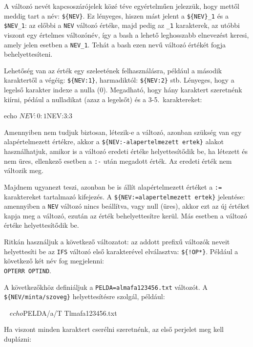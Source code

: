 A változó nevét kapcsoszárójelek közé téve egyértelműen jelezzük, hogy mettől
meddig tart a név: \texttt{\$\{NEV\}}. Ez lényeges, hiszen mást jelent a
\texttt{\$\{NEV\}\_1} és a \texttt{\$NEV\_1}: az előbbi a \texttt{NEV} változó
értéke, majd pedig az \texttt{\_1} karakterek, az utóbbi viszont egy értelmes
változónév, így a bash a lehető leghosszabb elnevezést keresi, amely jelen
esetben a \texttt{NEV\_1}. Tehát a bash ezen nevű változó értékét fogja
behelyettesíteni.

Lehetőség van az érték egy szeleetének felhasználásra, például 
a második karaktertől a végéig: \texttt{\$\{NEV:1\}},
harmadiktól: \texttt{\$\{NEV:2\}} stb. Lényeges, hogy a legelső karakter indexe
a nulla (0). Megadható, hogy hány karaktert szeretnénk kiírni, pédául a
nulladikat (azaz a legelsőt) és a 3-5.\ karaktereket:

\begin{VerbExample}
echo ${NEV:0:1} ${NEV:3:3}
\end{VerbExample}

Amennyiben nem tudjuk biztosan, létezik-e a változó, azonban szükség van egy
alapértelmezett értékre, akkor a \texttt{\$\{NEV:-alapertelmezett ertek\}}
alakot használhatjuk, amikor is a változó eredeti értéke helyettesítődik be, ha
létezett és nem üres, ellenkező esetben a \texttt{:-} után megadott érték. Az
eredeti érték nem változik meg.

Majdnem ugyanezt teszi, azonban be is állít alapértelmezett értéket a
\texttt{:=} karaktereket tartalmazó kifejezés. A
\texttt{\$\{NEV:=alapertelmezett ertek\}} jelentése: amennyiben a \texttt{NEV}
változó nincs beállítva, vagy null (üres), akkor ezt az új értéket kapja meg a
változó, ezután az érték behelyettesítre kerül. Más esetben a változó értéke
helyettesítődik be.

Ritkán használjuk a következő változatot: az addott prefixű változók neveit 
helyettesíti be az \texttt{IFS} változó első karakterével elválasztva:
\texttt{\$\{!OP*\}}. Például a következő két név fog megjelenni:\\
\texttt{OPTERR OPTIND}.

A következőkhöz definiáljuk a \texttt{PELDA=almafa123456.txt} változót. A
\texttt{\$\{NEV/minta/szoveg\}} helyettesítésre szolgál, például:

\begin{VerbExample}
~ $ echo ${PELDA/a/T}
Tlmafa123456.txt
\end{VerbExample}

Ha viszont minden karaktert cserélni szeretnénk, az első perjelet meg kell
duplázni:

